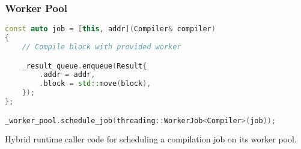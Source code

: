 \subsubsection{Worker Pool}



\begin{lstfloat}[H]
    \begin{lstlisting}[language=c++]
const auto job = [this, addr](Compiler& compiler)
{
    // Compile block with provided worker

    _result_queue.enqueue(Result{
        .addr = addr,
        .block = std::move(block),
    });
};

_worker_pool.schedule_job(threading::WorkerJob<Compiler>(job));
    \end{lstlisting}
    \caption{Hybrid runtime caller code for scheduling a compilation job on its worker pool.}
    \label{code:schedule-job-worker}
\end{lstfloat}